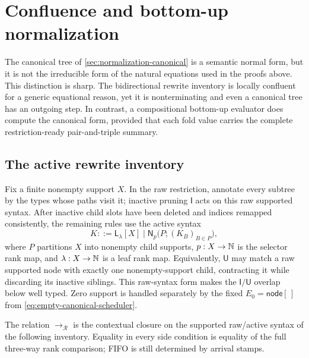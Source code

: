 \section{Confluence and bottom-up normalization}
\label{sec:confluence-bottom-up}

The canonical tree of \autoref{sec:normalization-canonical} is a semantic normal
form, but it is not the irreducible form of the natural equations used in the
proofs above.  This distinction is sharp.  The bidirectional rewrite inventory
is locally confluent for a generic equational reason, yet it is nonterminating
and even a canonical tree has an outgoing step.  In contrast, a compositional
bottom-up evaluator does compute the canonical form, provided that each fold
value carries the complete restriction-ready pair-and-triple summary.

\subsection{The active rewrite inventory}

Fix a finite nonempty support \(X\).  In the raw restriction, annotate every
subtree by the types whose paths visit it; inactive pruning \(\mathsf I\) acts
on this raw supported syntax.  After inactive child slots have been deleted
and indices remapped consistently, the remaining rules use the active syntax
\begin{equation}
 K ::= \mathsf L_\lambda[X]
   \mid \mathsf N_p\bigl(P;(K_B)_{B\in P}\bigr),
 \label{eq:rewrite-active-syntax}
\end{equation}
where \(P\) partitions \(X\) into nonempty child supports, \(p:X\to\mathbb{N}\)
is the selector rank map, and \(\lambda:X\to\mathbb{N}\) is a leaf rank map.
Equivalently, \(\mathsf U\) may match a raw supported node with exactly one
nonempty-support child, contracting it while discarding its inactive siblings.
This raw-syntax form makes the \(\mathsf I/\mathsf U\) overlap below well typed.
Zero support is handled separately by the fixed
\(E_0=\mathsf{node}[\,]\) from
\autoref{eq:empty-canonical-scheduler}.

The relation \(\longrightarrow_{\mathcal R}\) is the contextual closure on
the supported raw/active syntax of the following inventory.  Equality in
every side condition is equality of the full three-way rank comparison; FIFO
is still determined by arrival stamps.

